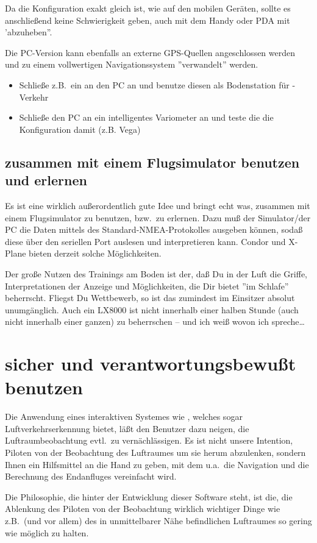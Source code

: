 Da die Konfiguration exakt gleich ist, wie auf den mobilen Geräten, sollte es anschließend keine Schwierigkeit geben,
auch mit dem Handy oder PDA mit \xc 'abzuheben''.


Die PC-Version kann ebenfalls an externe GPS-Quellen angeschlossen werden und zu einem
vollwertigen Navigationssystem ''verwandelt'' werden.


\begin{itemize}
\item Schließe z.B.\ ein \fl an den PC an und benutze diesen als Bodenstation für \fl-Verkehr
\item Schließe den PC an ein intelligentes Variometer an und teste die die Konfiguration damit  (z.B. Vega)
\end{itemize}

\subsection*{\xc zusammen mit einem Flugsimulator benutzen und erlernen}
Es ist eine wirklich außerordentlich gute Idee und bringt echt was, \xc zusammen mit einem Flugsimulator zu benutzen, bzw.\ zu erlernen.
Dazu muß der Simulator/der PC die Daten mittels des Standard-NMEA-Protokolles ausgeben können, sodaß  \xc diese über den seriellen Port auslesen und interpretieren kann.
{\sc Condor} und {\sc X-Plane} bieten derzeit solche Möglichkeiten.

Der große Nutzen des Trainings am Boden ist der, daß Du in der Luft die Griffe, Interpretationen der Anzeige und Möglichkeiten,
die Dir \xc bietet ''im Schlafe'' beherrscht. Fliegst Du Wettbewerb, so ist das zumindest im Einsitzer absolut unumgänglich.
Auch ein LX8000 ist nicht innerhalb einer halben Stunde (auch nicht innerhalb einer ganzen) zu beherrschen -- und ich weiß wovon ich spreche\dots


\section{\xc sicher und verantwortungsbewußt benutzen}
Die Anwendung eines interaktiven Systemes wie  \xc, welches sogar Luftverkehrserkennung bietet, läßt den Benutzer dazu neigen, die Luftraumbeobachtung evtl.\ zu vernächlässigen.
Es ist nicht unsere Intention, Piloten von der Beobachtung des Luftraumes um sie herum abzulenken,  sondern Ihnen  ein Hilfsmittel an die Hand zu geben,
mit dem u.a.\ die Navigation  und die Berechnung  des Endanfluges vereinfacht wird.

Die Philosophie, die hinter der Entwicklung dieser Software steht, ist die, die Ablenkung des Piloten von der Beobachtung wirklich wichtiger Dinge
wie z.B.\ (und vor allem) des in unmittelbarer Nähe befindlichen Luftraumes so gering wie möglich zu halten.

